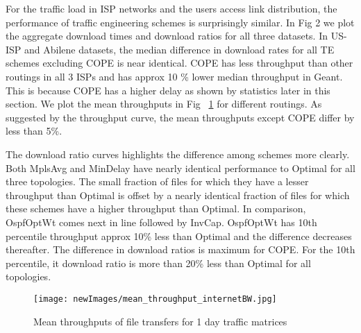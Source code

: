For the traffic load in  ISP networks and the users access link distribution, the performance of traffic engineering schemes is surprisingly similar. In  Fig 2 we plot the aggregate download times and download ratios for all three datasets. In US-ISP and Abilene datasets, the median difference in download rates for all TE schemes excluding COPE is near identical. COPE has less throughput than other routings in all 3 ISPs and has approx 10 \% lower median throughput in Geant.   This is because COPE has a higher delay as shown by statistics later in this section.  We plot the mean throughputs in Fig ~\ref{fig:allisps_aggregate_mean_internetBW} for different routings. As suggested by the throughput curve, the mean throughputs except COPE differ by less than 5\%.


The download ratio curves highlights the difference among schemes more clearly.  Both MplsAvg and MinDelay have nearly identical performance to Optimal for all three topologies. The small fraction of files for which they have a lesser throughput than Optimal  is offset by a nearly identical fraction of files for which these schemes have a higher throughput than Optimal.  In comparison, OspfOptWt comes next in line followed by InvCap. OspfOptWt has 10th percentile throughput approx 10\% less than Optimal and the difference decreases thereafter. The difference in download ratios is maximum for COPE. For the 10th percentile, it download ratio is more than 20\% less than Optimal for all topologies.

\begin{figure}[tbh]
  \begin{center}
\texttt{[image: newImages/mean\_throughput\_internetBW.jpg]}
  \end{center}
  \caption{Mean throughputs of file transfers for 1 day traffic matrices }
  \label{fig:allisps_aggregate_mean_internetBW}
\end{figure}

